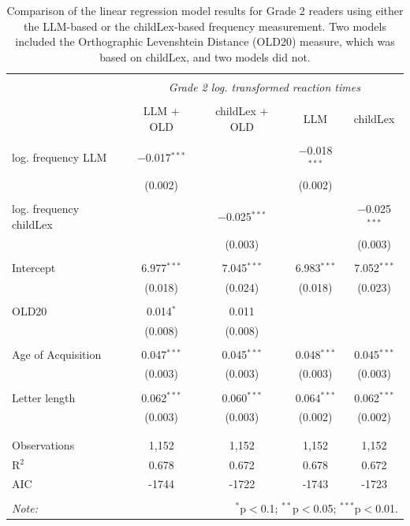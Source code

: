 \documentclass[manuscript]{stjour}
\begin{document}
\begin{table}[!htbp] \centering 
  \caption{Comparison of the linear regression model results for Grade 2 readers using either the LLM-based or the childLex-based frequency measurement. Two models included the Orthographic Levenshtein Distance (OLD20) measure, which was based on childLex, and two models did not.} 
  \label{G2stats} 
\begin{tabular}{@{\extracolsep{5pt}}lcccc} 
\\[-1.8ex]\hline 
\hline \\[-1.8ex] 
 & \multicolumn{4}{c}{\textit{Grade 2 log. transformed reaction times}} \\ 
\cline{2-5} 
\\[-1.8ex] & LLM + OLD & childLex + OLD & LLM & childLex\\ 
\hline \\[-1.8ex] 
log. frequency LLM & $-$0.017$^{***}$ &  & $-$0.018$^{***}$ &  \\ 
  & (0.002) &  & (0.002) &  \\ 
  & & & & \\ 
 log. frequency childLex &  & $-$0.025$^{***}$ &  & $-$0.025$^{***}$ \\ 
  &  & (0.003) &  & (0.003) \\ 
  & & & & \\
  Intercept & 6.977$^{***}$ & 7.045$^{***}$ & 6.983$^{***}$ & 7.052$^{***}$ \\ 
  & (0.018) & (0.024) & (0.018) & (0.023) \\ 
  & & & & \\ 
  OLD20 & 0.014$^{*}$ & 0.011 &  &  \\ 
  & (0.008) & (0.008) &  &  \\ 
  & & & & \\ 
 Age of Acquisition & 0.047$^{***}$ & 0.045$^{***}$ & 0.048$^{***}$ & 0.045$^{***}$ \\ 
  & (0.003) & (0.003) & (0.003) & (0.003) \\ 
  & & & & \\ 
 Letter length & 0.062$^{***}$ & 0.060$^{***}$ & 0.064$^{***}$ & 0.062$^{***}$ \\ 
  & (0.003) & (0.003) & (0.002) & (0.002) \\ 
  & & & & \\  
\hline \\[-1.8ex] 
Observations & 1,152 & 1,152 & 1,152 & 1,152 \\ 
R$^{2}$ & 0.678 & 0.672 & 0.678 & 0.672 \\ 
AIC & -1744 & -1722 & -1743 & -1723 \\ 

\hline 
\hline \\[-1.8ex] 
\textit{Note:}  & \multicolumn{4}{r}{$^{*}$p$<$0.1; $^{**}$p$<$0.05; $^{***}$p$<$0.01.} \\ 
\end{tabular} 
\end{table} 
\end{document}
